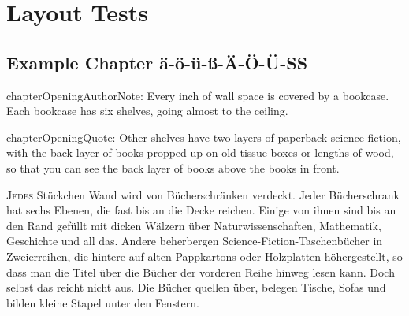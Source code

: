 
\RequirePackage[pdf]{layout/hp-book}











{
\pagestyle{empty}

\def\volumenumber{}
\def\volumetitle{Layout-Test vom \today{}}

% 

% 
\cleartorecto
}
\setcounter{page}{1}

\part{Layout Tests}


\chapter{Example Chapter ä-ö-ü-ß-Ä-Ö-Ü-SS}

\begin{chapterOpeningAuthorNote}
chapterOpeningAuthorNote: Every inch of wall space is covered by a bookcase. Each bookcase has six shelves, going almost to the ceiling.
\end{chapterOpeningAuthorNote}
\begin{chapterOpeningQuote}
chapterOpeningQuote: Other shelves have two layers of paperback science fiction, with the back layer of books propped up on old tissue boxes or lengths of wood, so that you can see the back layer of books above the books in front.
\end{chapterOpeningQuote}

\lettrine{J}{edes} Stückchen Wand wird von Bücherschränken verdeckt. Jeder Bücherschrank hat sechs Ebenen, die fast bis an die Decke reichen. Einige von ihnen sind bis an den Rand gefüllt mit dicken Wälzern über Naturwissenschaften, Mathematik, Geschichte und all das. Andere beherbergen Science-Fiction-Taschenbücher in Zweierreihen, die hintere auf alten Pappkartons oder Holzplatten höhergestellt, so dass man die Titel über die Bücher der vorderen Reihe hinweg lesen kann. Doch selbst das reicht nicht aus. Die Bücher quellen über, belegen Tische, Sofas und bilden kleine Stapel unter den Fenstern.

